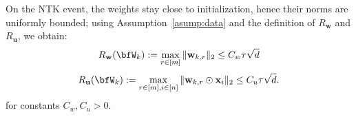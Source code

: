 \documentclass[10pt]{article} %
\theoremstyle{definition}
\theoremstyle{plain}
\def\bfu{{\mathbf{u}}}\def\bfv{{\mathbf{v}}}\def\bfw{{\mathbf{w}}}\def\bfx{{\mathbf{x}}}
\begin{document}
On the NTK event, the weights stay close to initialization, hence their norms
are uniformly bounded; using Assumption~\ref{asump:data} and the definition of
$R_{\bfw}$ and $R_{\bfu}$, we obtain:
\begin{equation}
\label{eq:Rw_bound}
    R_{\bfw}(\bfW_k)
    :=
    \max_{r\in[m]}\|\bfw_{k,r}\|_2
     \le 
    C_w\tau \sqrt{d}
\end{equation}
\begin{equation}
\label{eq:Ru_bound}
    R_{\bfu}(\bfW_k)
    :=
    \max_{r\in[m],i\in[n]}\|\bfw_{k,r}\odot\bfx_i\|_2
     \le 
    C_u\tau\sqrt{d}.
\end{equation}
for constants $C_w,C_u>0$.  

\end{document}
